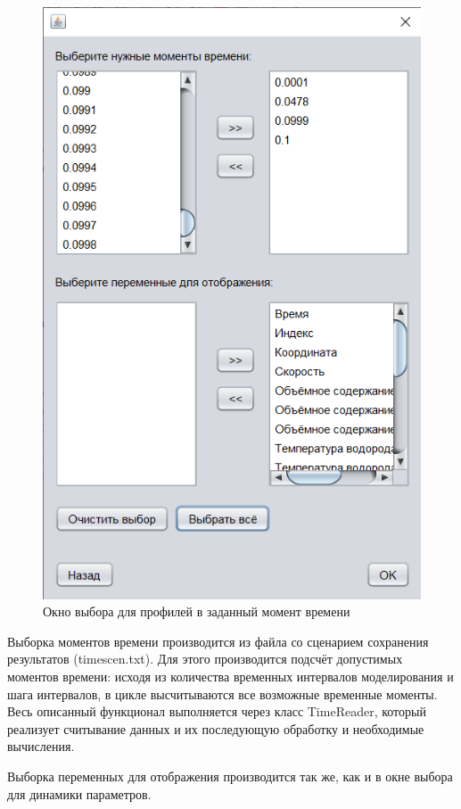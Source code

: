 \begin{figure}[H]
	\centering
	\includegraphics[width=0.5\linewidth]{pics/time-all}
	\caption{Окно выбора для профилей в заданный момент времени}
	\label{fig:time-all}
\end{figure}
Выборка моментов времени производится из файла со сценарием сохранения результатов (timescen.txt). Для этого производится подсчёт допустимых моментов времени: исходя из количества временных интервалов моделирования и шага интервалов, в цикле высчитываются все возможные временные моменты. Весь описанный функционал выполняется через класс TimeReader, который реализует считывание данных и их последующую обработку и необходимые вычисления. 

Выборка переменных для отображения производится так же, как и в окне выбора для динамики параметров. 

